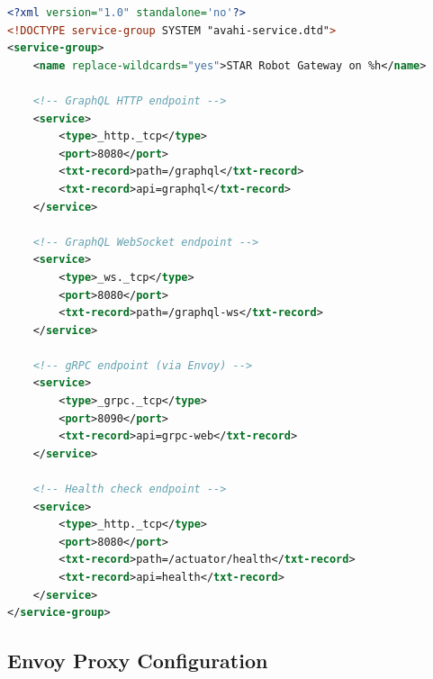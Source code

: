 \begin{lstlisting}[language=XML, caption=star-gateway/deployment/avahi/star-robot.service]
<?xml version="1.0" standalone='no'?>
<!DOCTYPE service-group SYSTEM "avahi-service.dtd">
<service-group>
    <name replace-wildcards="yes">STAR Robot Gateway on %h</name>

    <!-- GraphQL HTTP endpoint -->
    <service>
        <type>_http._tcp</type>
        <port>8080</port>
        <txt-record>path=/graphql</txt-record>
        <txt-record>api=graphql</txt-record>
    </service>

    <!-- GraphQL WebSocket endpoint -->
    <service>
        <type>_ws._tcp</type>
        <port>8080</port>
        <txt-record>path=/graphql-ws</txt-record>
    </service>

    <!-- gRPC endpoint (via Envoy) -->
    <service>
        <type>_grpc._tcp</type>
        <port>8090</port>
        <txt-record>api=grpc-web</txt-record>
    </service>

    <!-- Health check endpoint -->
    <service>
        <type>_http._tcp</type>
        <port>8080</port>
        <txt-record>path=/actuator/health</txt-record>
        <txt-record>api=health</txt-record>
    </service>
</service-group>
\end{lstlisting}

\subsection{Envoy Proxy Configuration}

